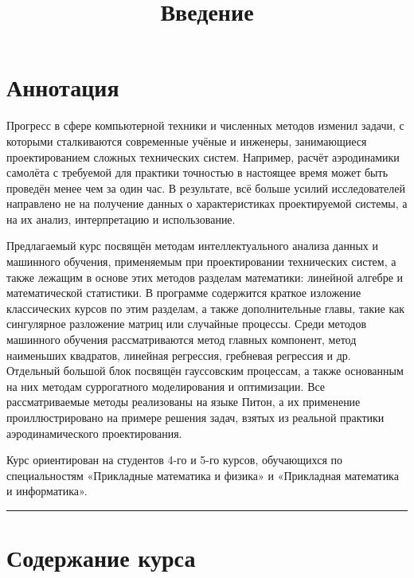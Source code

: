 \documentclass[11pt,a4paper]{article}
\title{Введение}
\renewcommand{\linethickness}{0.1ex}
\begin{document}
    
    \maketitle
    
    \hypertarget{ux430ux43dux43dux43eux442ux430ux446ux438ux44f}{%
\section{Аннотация}\label{ux430ux43dux43dux43eux442ux430ux446ux438ux44f}}

Прогресс в сфере компьютерной техники и численных методов изменил
задачи, с которыми сталкиваются современные учёные и инженеры,
занимающиеся проектированием сложных технических систем. Например,
расчёт аэродинамики самолёта с требуемой для практики точностью в
настоящее время может быть проведён менее чем за один час. В результате,
всё больше усилий исследователей направлено не на получение данных о
характеристиках проектируемой системы, а на их анализ, интерпретацию и
использование.

Предлагаемый курс посвящён методам интеллектуального анализа данных и
машинного обучения, применяемым при проектировании технических систем, а
также лежащим в основе этих методов разделам математики: линейной
алгебре и математической статистики. В программе содержится краткое
изложение классических курсов по этим разделам, а также дополнительные
главы, такие как сингулярное разложение матриц или случайные процессы.
Среди методов машинного обучения рассматриваются метод главных
компонент, метод наименьших квадратов, линейная регрессия, гребневая
регрессия и др. Отдельный большой блок посвящён гауссовским процессам, а
также основанным на них методам суррогатного моделирования и
оптимизации. Все рассматриваемые методы реализованы на языке Питон, а их
применение проиллюстрировано на примере решения задач, взятых из
реальной практики аэродинамического проектирования.

Курс ориентирован на студентов 4-го и 5-го курсов, обучающихся по
специальностям «Прикладные математика и физика» и «Прикладная математика
и информатика».

    \begin{center}\rule{0.5\linewidth}{\linethickness}\end{center}

    \hypertarget{ux441ux43eux434ux435ux440ux436ux430ux43dux438ux435-ux43aux443ux440ux441ux430}{%
\section{Содержание
курса}\label{ux441ux43eux434ux435ux440ux436ux430ux43dux438ux435-ux43aux443ux440ux441ux430}}
\end{document}
